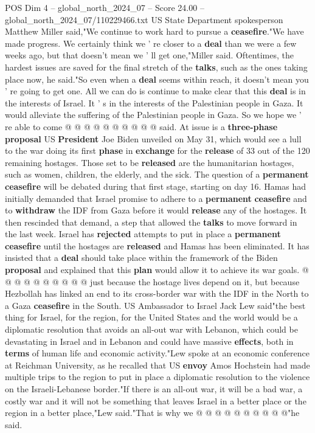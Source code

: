 \begin{textsample}{POS Dim 4 – global\_north\_2024\_07 – Score 24.00 – global\_north\_2024\_07/110229466.txt}
US State Department spokesperson Matthew Miller said,"We continue to work hard to pursue a \textbf{ceasefire}."We have made progress.
We certainly think we ' re closer to a \textbf{deal} than we were a few weeks ago, but that doesn't mean we ' ll get one,"Miller said.
Oftentimes, the hardest issues are saved for the final stretch of the \textbf{talks}, such as the ones taking place now, he said."So even when a \textbf{deal} seems within reach, it doesn't mean you ' re going to get one.
All we can do is continue to make clear that this \textbf{deal} is in the interests of Israel.
It ' s in the interests of the Palestinian people in Gaza.
It would alleviate the suffering of the Palestinian people in Gaza.
So we hope we ' re able to come @ @ @ @ @ @ @ @ @ @ said.
At issue is a \textbf{three-phase} \textbf{proposal} US \textbf{President} Joe Biden unveiled on May 31, which would see a lull to the war doing its first \textbf{phase} in \textbf{exchange} for the \textbf{release} of 33 out of the 120 remaining hostages.
Those set to be \textbf{released} are the humanitarian hostages, such as women, children, the elderly, and the sick.
The question of a \textbf{permanent} \textbf{ceasefire} will be debated during that first stage, starting on day 16.
Hamas had initially demanded that Israel promise to adhere to a \textbf{permanent} \textbf{ceasefire} and to \textbf{withdraw} the IDF from Gaza before it would \textbf{release} any of the hostages.
It then rescinded that demand, a step that allowed the \textbf{talks} to move forward in the last week.
Israel has \textbf{rejected} attempts to put in place a \textbf{permanent} \textbf{ceasefire} until the hostages are \textbf{released} and Hamas has been eliminated.
It has insisted that a \textbf{deal} should take place within the framework of the Biden \textbf{proposal} and explained that this \textbf{plan} would allow it to achieve its war goals. @ @ @ @ @ @ @ @ @ @ just because the hostage lives depend on it, but because Hezbollah has linked an end to its cross-border war with the IDF in the North to a Gaza \textbf{ceasefire} in the South.
US Ambassador to Israel Jack Lew said"the best thing for Israel, for the region, for the United States and the world would be a diplomatic resolution that avoids an all-out war with Lebanon, which could be devastating in Israel and in Lebanon and could have massive \textbf{effects}, both in \textbf{terms} of human life and economic activity."Lew spoke at an economic conference at Reichman University, as he recalled that US \textbf{envoy} Amos Hochstein had made multiple trips to the region to put in place a diplomatic resolution to the violence on the Israeli-Lebanese border."If there is an all-out war, it will be a bad war, a costly war and it will not be something that leaves Israel in a better place or the region in a better place,"Lew said."That is why we @ @ @ @ @ @ @ @ @ @"he said.

\end{textsample}
